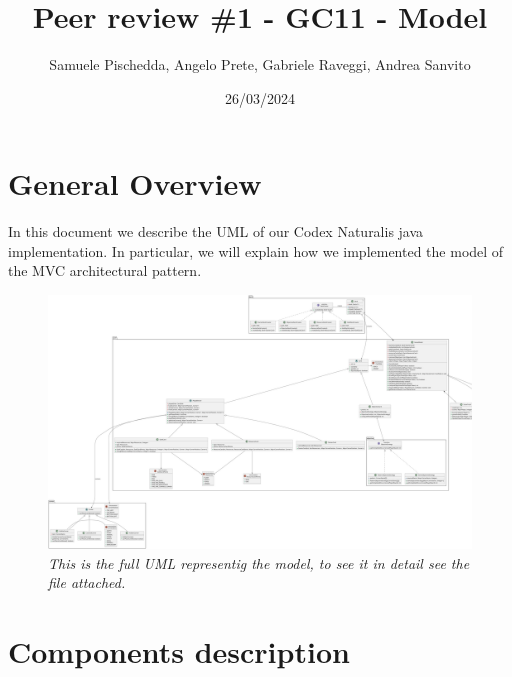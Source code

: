 \documentclass{article}
\title{Peer review \#1 - GC11 - Model}
\author{Samuele Pischedda, Angelo Prete, Gabriele Raveggi, Andrea Sanvito }
\date{26/03/2024}
\begin{document}
\begin{titlepage}
\maketitle
\end{titlepage}

\section*{General Overview}
In this document we describe the UML of our Codex Naturalis java implementation. In particular, we will explain how we implemented the model of the MVC architectural pattern.
\vspace{1cm}
\begin{figure}[!h]
    \captionsetup{labelformat=empty}
    \centering
    \includegraphics[scale=0.1]{pngs/model}
    \caption{\textit{This is the full UML representig the model, to see it in detail see the file attached.}}

\end{figure}


\newpage
\section*{Components description}
\setcounter{section}{1}
\end{document}
